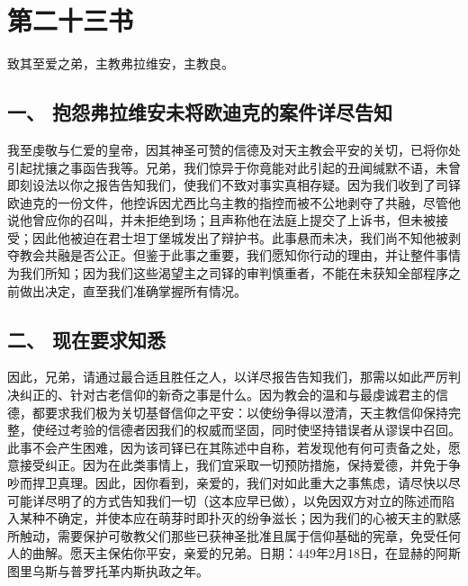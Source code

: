 
\section{第二十三书}

致其至爱之弟，主教弗拉维安，主教良。\par


\subsection{一、 抱怨弗拉维安未将欧迪克的案件详尽告知}

我至虔敬与仁爱的皇帝，因其神圣可赞的信德及对天主教会平安的关切，已将你处引起扰攘之事函告我等。兄弟，我们惊异于你竟能对此引起的丑闻缄默不语，未曾即刻设法以你之报告告知我们，使我们不致对事实真相存疑。因为我们收到了司铎欧迪克的一份文件，他控诉因尤西比乌主教的指控而被不公地剥夺了共融，尽管他说他曾应你的召叫，并未拒绝到场；且声称他在法庭上提交了上诉书，但未被接受；因此他被迫在君士坦丁堡城发出了辩护书。此事悬而未决，我们尚不知他被剥夺教会共融是否公正。但鉴于此事之重要，我们愿知你行动的理由，并让整件事情为我们所知；因为我们这些渴望主之司铎的审判慎重者，不能在未获知全部程序之前做出决定，直至我们准确掌握所有情况。\par


\subsection{二、 现在要求知悉}

因此，兄弟，请通过最合适且胜任之人，以详尽报告告知我们，那需以如此严厉判决纠正的、针对古老信仰的新奇之事是什么。因为教会的温和与最虔诚君主的信德，都要求我们极为关切基督信仰之平安：以使纷争得以澄清，天主教信仰保持完整，使经过考验的信德者因我们的权威而坚固，同时使坚持错误者从谬误中召回。此事不会产生困难，因为该司铎已在其陈述中自称，若发现他有何可责备之处，愿意接受纠正。因为在此类事情上，我们宜采取一切预防措施，保持爱德，并免于争吵而捍卫真理。因此，因你看到，亲爱的，我们对如此重大之事焦虑，请尽快以尽可能详尽明了的方式告知我们一切（这本应早已做），以免因双方对立的陈述而陷入某种不确定，并使本应在萌芽时即扑灭的纷争滋长；因为我们的心被天主的默感所触动，需要保护可敬教父们那些已获神圣批准且属于信仰基础的宪章，免受任何人的曲解。愿天主保佑你平安，亲爱的兄弟。日期：449年2月18日，在显赫的阿斯图里乌斯与普罗托革内斯执政之年。\par

